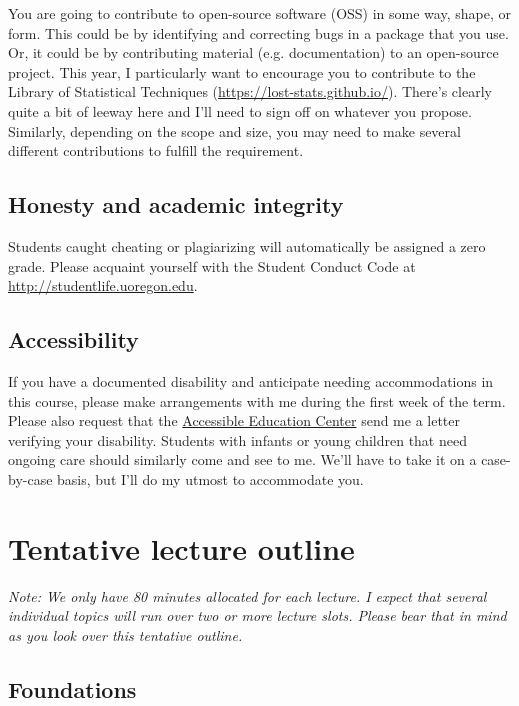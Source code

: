\documentclass[12]{article}
\begin{document}
You are going to contribute to open-source software (OSS) in some way, shape, or form. This could be by identifying and correcting bugs in a package that you use. Or, it could be by contributing material (e.g. documentation) to an open-source project. This year, I particularly want to encourage you to contribute to the Library of Statistical Techniques (\url{https://lost-stats.github.io/}). There's clearly quite a bit of leeway here and I'll need to sign off on whatever you propose. Similarly, depending on the scope and size, you may need to make several different contributions to fulfill the requirement.

\subsection*{Honesty and academic integrity}

Students caught cheating or plagiarizing will automatically be assigned a zero grade. Please acquaint yourself with the Student Conduct Code at \url{http://studentlife.uoregon.edu}.

\subsection*{Accessibility}

If you have a documented disability and anticipate needing accommodations in this course, please make arrangements with me during the first week of the term. Please also request that the \href{https://aec.uoregon.edu/}{Accessible Education Center} send me a letter verifying your disability. Students with infants or young children that need ongoing care should similarly come and see to me. We'll have to take it on a case-by-case basis, but I'll do my utmost to accommodate you.

\newpage
\section*{Tentative lecture outline}
\label{sec:outline}

\textit{Note: We only have 80 minutes allocated for each lecture. I expect that several individual topics will run over two or more lecture slots. Please bear that in mind as you look over this tentative outline.}

\subsection*{Foundations}
\end{document}
